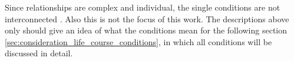 Since relationships are complex and individual, the single conditions are not interconnected \cite{sassler2010partnering}. Also this is not the focus of this work. The descriptions above only should give an idea of what the conditions mean for the following section \ref{sec:consideration_life_course_conditions}, in which all conditions will be discussed in detail.
